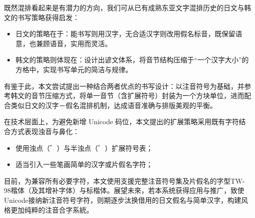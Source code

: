 既然混排看起来是有潜力的方向，我们可从已有成熟东亚文字混排历史的日文与韩文的书写策略获得启发：
\begin{itemize}
	\item 日文的策略在于：能书写则用汉字，无合适汉字则改用假名标音，既保留语意，也兼顾语音，实用而灵活。
	\item 韩文的策略则体现在：设计出谚文体系，将音节结构压缩于“一个汉字大小”的方格中，实现书写单元的简洁与规律。
\end{itemize}

有鉴于此，本文尝试提出一种结合两者优点的书写设计：以注音符号为基础，并参考韩文的音节压缩方式，将单一音节（含扩展符号）封装为一个方块单位，进而配合类似日文的汉字－假名混排机制，达成语音准确与排版美观的平衡。\par

在技术层面上，为避免新增 Unicode 码位，本文提出的扩展策略采用既有字符结合方式表现浊音与鼻化：
\begin{itemize}
	\item 使用浊点（゛）与半浊点（゜）扩展符号表；
	\item 适当引入一些笔画简单的汉字或片假名字符；
\end{itemize}
目前，为兼容所有必要字符，本文使用支援完整注音符号集及片假名的字型TW-98楷体（及其增补字体）与标楷体。展望未來，若本系统获得应用与推广，致使Unicode接纳新注音符号字符，则期逐步汰换借用的日文假名与简单汉字，构建风格更加纯粹的注音合字系統。\par
\clearpage